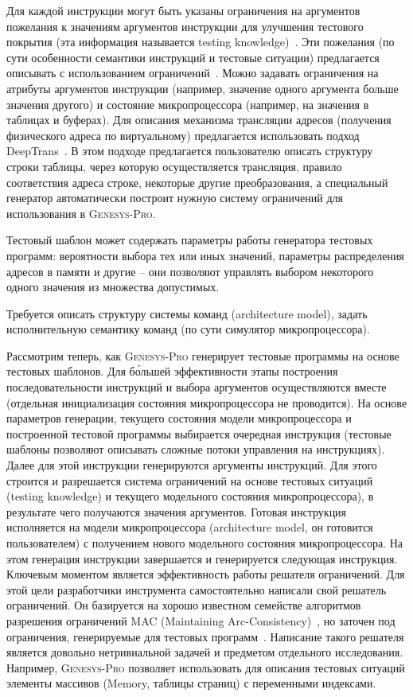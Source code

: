 Для каждой инструкции могут быть указаны ограничения на аргументов
пожелания к значениям аргументов инструкции для улучшения тестового
покрытия (эта информация называется testing
knowledge)~\cite{GenesysTK}. Эти пожелания (по сути особенности
семантики инструкций и тестовые ситуации) предлагается описывать с
использованием ограничений~\cite{GenesysPro2004Innovations}. Можно
задавать ограничения на атрибуты аргументов инструкции (например,
значение одного аргумента больше значения другого) и состояние
микропроцессора (например, на значения в таблицах и буферах). Для
описания механизма трансляции адресов (получения физического адреса
по виртуальному) предлагается использовать подход
DeepTrans~\cite{DeepTrans}. В этом подходе предлагается пользователю
описать структуру строки таблицы, через которую осуществляется
трансляция, правило соответствия адреса строке, некоторые другие
преобразования, а специальный генератор автоматически построит
нужную систему ограничений для использования в \textsc{Genesys-Pro}.

Тестовый шаблон может содержать параметры работы генератора тестовых
программ: вероятности выбора тех или иных значений, параметры
распределения адресов в памяти и другие -- они позволяют управлять
выбором некоторого одного значения из множества допустимых.

Требуется описать структуру системы команд (architecture model),
задать исполнительную семантику команд (по сути симулятор
микропроцессора).

Рассмотрим теперь, как \textsc{Genesys-Pro} генерирует тестовые
программы на основе тестовых шаблонов. Для б\'{о}льшей эффективности
этапы построения последовательности инструкций и выбора аргументов
осуществляются вместе (отдельная инициализация состояния
микропроцессора не проводится). На основе параметров генерации,
текущего состояния модели микропроцессора и построенной тестовой
программы выбирается очередная инструкция (тестовые шаблоны
позволяют описывать сложные потоки управления на инструкциях). Далее
для этой инструкции генерируются аргументы инструкций. Для этого
строится и разрешается система ограничений на основе тестовых
ситуаций (testing knowledge) и текущего модельного состояния
микропроцессора), в результате чего получаются значения аргументов.
Готовая инструкция исполняется на модели микропроцессора
(architecture model, он готовится пользователем) с получением нового
модельного состояния микропроцессора. На этом генерация инструкции
завершается и генерируется следующая инструкция. Ключевым моментом
является эффективность работы решателя ограничений. Для этой цели
разработчики инструмента самостоятельно написали свой решатель
ограничений. Он базируется на хорошо известном семействе алгоритмов
разрешения ограничений MAC (Maintaining Arc-Consistency)~\cite{CSP},
но заточен под ограничения, генерируемые для тестовых
программ~\cite{GenesysSolver}. Написание такого решателя является
довольно нетривиальной задачей и предметом отдельного исследования.
Например, \textsc{Genesys-Pro} позволяет использовать для описания
тестовых ситуаций элементы массивов (Memory, таблицы страниц) с
переменными индексами.

